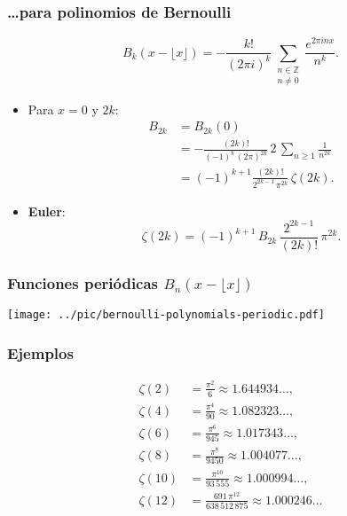 \documentclass{beamer}
\begin{document}

\begin{frame}
  \frametitle{\dots{}para polinomios de Bernoulli}

  \[ B_k (x - \lfloor x\rfloor) = -\frac{k!}{(2\pi i)^k}\sum_{\substack{n\in \mathbb{Z} \\ n \ne 0}} \frac{e^{2\pi i n x}}{n^k}. \]

  \begin{itemize}
  \item<2-> Para $x = 0$ y $2k$:
    \begin{align*}
      B_{2k} & = B_{2k} (0) \\
      & = -\frac{(2k)!}{(-1)^k\,(2\pi)^{2k}} \, 2\,\sum_{n \ge 1} \frac{1}{n^{2k}} \\
      & = (-1)^{k+1}\frac{(2k)!}{2^{2k-1}\,\pi^{2k}}\,\zeta (2k).
    \end{align*}

  \item<3-> \textbf{Euler}:
    $$\zeta (2k) = (-1)^{k+1} \, B_{2k}\,\frac{2^{2k-1}}{(2k)!}\,\pi^{2k}.$$
  \end{itemize}
\end{frame}


\begin{frame}
  \frametitle{Funciones periódicas $B_n (x - \lfloor x\rfloor)$}

  \begin{center}
    \texttt{[image: ../pic/bernoulli-polynomials-periodic.pdf]}
  \end{center}
\end{frame}


\begin{frame}
  \frametitle{Ejemplos}

  \begin{align*}
    \zeta (2) & = \frac{\pi^2}{6} \approx 1.644934\ldots, \\
    \zeta (4) & = \frac{\pi^4}{90} \approx 1.082323\ldots, \\
    \zeta (6) & = \frac{\pi^6}{945}  \approx 1.017343\ldots, \\
    \zeta (8) & = \frac{\pi^8}{9450} \approx 1.004077\ldots, \\
    \zeta (10) & = \frac{\pi^{10}}{93\,555} \approx 1.000994\ldots, \\
    \zeta (12) & = \frac{691\,\pi^{12}}{638\,512\,875} \approx 1.000246\ldots
  \end{align*}
\end{frame}
\end{document}

